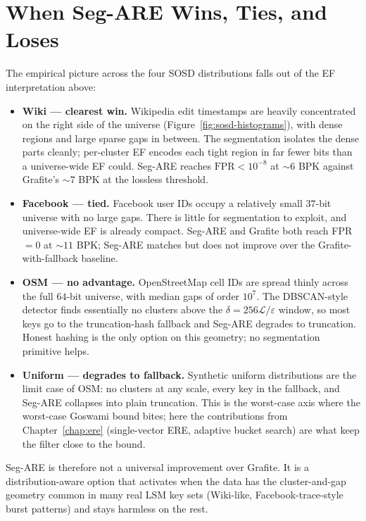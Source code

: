\section{When Seg-ARE Wins, Ties, and Loses}
\label{sec:conclusion-where}

The empirical picture across the four SOSD distributions falls out of
the EF interpretation above:

\begin{itemize}
    \item \textbf{Wiki --- clearest win.} Wikipedia edit timestamps
    are heavily concentrated on the right side of the universe
    (Figure~\ref{fig:sosd-histograms}), with dense regions and large
    sparse gaps in between. The segmentation isolates the dense parts
    cleanly; per-cluster EF encodes each tight region in far fewer
    bits than a universe-wide EF could. Seg-ARE reaches
    $\mathrm{FPR} < 10^{-8}$ at $\sim\!6$ BPK against Grafite's
    $\sim\!7$ BPK at the lossless threshold.
    \item \textbf{Facebook --- tied.} Facebook user IDs occupy a
    relatively small $37$-bit universe with no large gaps. There is
    little for segmentation to exploit, and universe-wide EF is
    already compact. Seg-ARE and Grafite both reach FPR $= 0$ at
    $\sim\!11$ BPK; Seg-ARE matches but does not improve over the
    Grafite-with-fallback baseline.
    \item \textbf{OSM --- no advantage.} OpenStreetMap cell IDs are
    spread thinly across the full $64$-bit universe, with median gaps
    of order $10^7$. The DBSCAN-style detector finds essentially no
    clusters above the $\delta = 256\mathcal{L}/\varepsilon$ window,
    so most keys go to the truncation-hash fallback and Seg-ARE
    degrades to truncation. Honest hashing is the only option on this
    geometry; no segmentation primitive helps.
    \item \textbf{Uniform --- degrades to fallback.} Synthetic uniform
    distributions are the limit case of OSM: no clusters at any scale,
    every key in the fallback, and Seg-ARE collapses into plain
    truncation. This is the worst-case axis where the worst-case
    Goswami bound bites; here the contributions from
    Chapter~\ref{chap:ere} (single-vector ERE, adaptive bucket search)
    are what keep the filter close to the bound.
\end{itemize}

Seg-ARE is therefore not a universal improvement over Grafite. It is a
distribution-aware option that activates when the data has the
cluster-and-gap geometry common in many real LSM key sets
(Wiki-like, Facebook-trace-style burst patterns) and stays harmless on
the rest.

